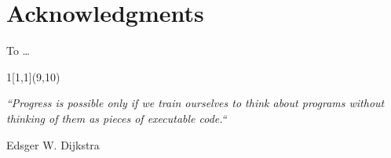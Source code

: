 {}

\begingroup

\chapter*{Acknowledgments}

To \dots

\begin{textblock}{1}[1,1](9,10)
  \epigraph{\textit{``Progress is possible only if we train ourselves to think 
  about programs without thinking of them as pieces of executable code.``}}
  {Edsger W. Dijkstra}
\end{textblock}


\endgroup
